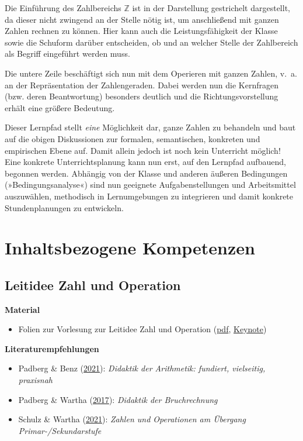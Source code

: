 \documentclass[
]{scrbook}
\providecommand{\tightlist}{%
  \setlength{\itemsep}{0pt}\setlength{\parskip}{0pt}}
\renewenvironment{quote}{
  \list{}{
	\leftmargin0.2cm   %
    \rightmargin\leftmargin
      	\def\FrameCommand
    {%
        {\color{quoteColor}\vrule width 2pt}%
        \hspace{0pt}%
    }%
    \MakeFramed{\advance \hsize -\width \FrameRestore}    \color{quoteColor}
    }
  \item\relax
}
{\endlist\color{black}\endMakeFramed}
\theoremstyle{definition}
\theoremstyle{definition}
\theoremstyle{definition}
\theoremstyle{definition}
\theoremstyle{remark}
\begin{document}
Die Einführung des Zahlbereichs \(\mathbb{Z}\) ist in der Darstellung gestrichelt dargestellt, da dieser nicht zwingend an der Stelle nötig ist, um anschließend mit ganzen Zahlen rechnen zu können. Hier kann auch die Leistungsfähigkeit der Klasse sowie die Schuform darüber entscheiden, ob und an welcher Stelle der Zahlbereich als Begriff eingeführt werden muss.

Die untere Zeile beschäftigt sich nun mit dem Operieren mit ganzen Zahlen, v.~a. an der Repräsentation der Zahlengeraden. Dabei werden nun die Kernfragen (bzw. deren Beantwortung) besonders deutlich und die Richtungsvorstellung erhält eine größere Bedeutung.

Dieser Lernpfad stellt \emph{eine} Möglichkeit dar, ganze Zahlen zu behandeln und baut auf die obigen Diskussionen zur formalen, semantischen, konkreten und empirischen Ebene auf. Damit allein jedoch ist noch kein Unterricht möglich! Eine konkrete Unterrichtsplanung kann nun erst, auf den Lernpfad aufbauend, begonnen werden. Abhängig von der Klasse und anderen äußeren Bedingungen (»Bedingungsanalyse«) sind nun geeignete Aufgabenstellungen und Arbeitsmittel auszuwählen, methodisch in Lernumgebungen zu integrieren und damit konkrete Stundenplanungen zu entwickeln.

\hypertarget{part-inhaltsbezogene-kompetenzen}{%
\part*{Inhaltsbezogene Kompetenzen}\label{part-inhaltsbezogene-kompetenzen}}

\hypertarget{leitidee-zahl-und-operation}{%
\chapter{Leitidee Zahl und Operation}\label{leitidee-zahl-und-operation}}

\begin{quote}
\textbf{Material}

\begin{itemize}
\tightlist
\item
  Folien zur Vorlesung zur Leitidee Zahl und Operation (\href{files/Stoffdidaktik-WiSe2223-Kap10.pdf}{pdf}, \href{files/Stoffdidaktik-WiSe2223-Kap10.key}{Keynote})
\end{itemize}

\textbf{Literaturempfehlungen}

\begin{itemize}
\tightlist
\item
  Padberg \& Benz (\protect\hyperlink{ref-Padberg2021}{2021}): \emph{Didaktik der Arithmetik: fundiert, vielseitig, praxisnah}
\item
  Padberg \& Wartha (\protect\hyperlink{ref-Padberg:2017}{2017}): \emph{Didaktik der Bruchrechnung}
\item
  Schulz \& Wartha (\protect\hyperlink{ref-Schulz2021}{2021}): \emph{Zahlen und Operationen am Übergang Primar-/Sekundarstufe}
\end{itemize}
\end{quote}
\end{document}
